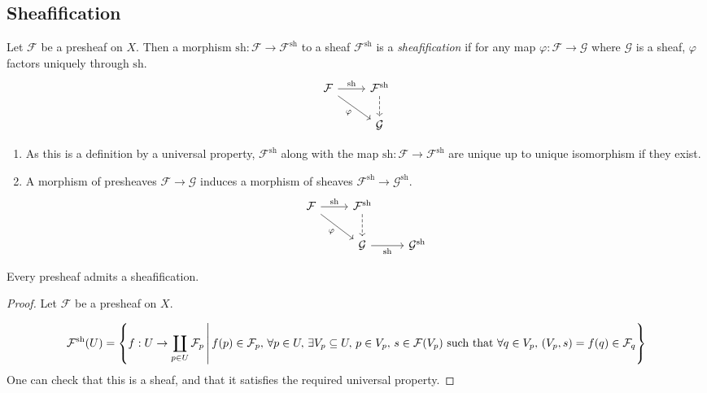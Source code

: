 \subsection{Sheafification}
\begin{definition}
    Let \( \mathcal F \) be a presheaf on \( X \).
    Then a morphism \( \mathrm{sh} : \mathcal F \to \mathcal F^{\mathrm{sh}} \) to a sheaf \( \mathcal F^{\mathrm{sh}} \) is a \emph{sheafification} if for any map \( \varphi : \mathcal F \to \mathcal G \) where \( \mathcal G \) is a sheaf, \( \varphi \) factors uniquely through \( \mathrm{sh} \).
    \[\begin{tikzcd}
        {\mathcal F} & {\mathcal F^{\mathrm{sh}}} \\
        & {\mathcal G}
        \arrow["{\mathrm{sh}}", from=1-1, to=1-2]
        \arrow[dashed, from=1-2, to=2-2]
        \arrow["\varphi"', from=1-1, to=2-2]
    \end{tikzcd}\]
\end{definition}
\begin{remark}
    \begin{enumerate}
        \item As this is a definition by a universal property, \( \mathcal F^{\mathrm{sh}} \) along with the map \( \mathrm{sh} : \mathcal F \to \mathcal F^{\mathrm{sh}} \) are unique up to unique isomorphism if they exist.
        \item A morphism of presheaves \( \mathcal F \to \mathcal G \) induces a morphism of sheaves \( \mathcal F^{\mathrm{sh}} \to \mathcal G^{\mathrm{sh}} \).
        \[\begin{tikzcd}
            {\mathcal F} & {\mathcal F^{\mathrm{sh}}} \\
            & {\mathcal G} & {\mathcal G^{\mathrm{sh}}}
            \arrow["{\mathrm{sh}}", from=1-1, to=1-2]
            \arrow[dashed, from=1-2, to=2-2]
            \arrow["\varphi"', from=1-1, to=2-2]
            \arrow["{\mathrm{sh}}"', from=2-2, to=2-3]
        \end{tikzcd}\]
    \end{enumerate}
\end{remark}
\begin{proposition}
    Every presheaf admits a sheafification.
\end{proposition}
\begin{proof}
    Let \( \mathcal F \) be a presheaf on \( X \).

    \[ \mathcal F^{\mathrm{sh}}(U) = \qty{f : U \to \coprod_{p \in U} \mathcal F_p \,\middle|\,f(p) \in \mathcal F_p,\, \forall p \in U,\, \exists V_p \subseteq U,\, p \in V_p,\, s \in \mathcal F(V_p) \text{ such that } \forall q \in V_p,\, (V_p, s) = f(q) \in \mathcal F_q} \]
    One can check that this is a sheaf, and that it satisfies the required universal property.
\end{proof}
